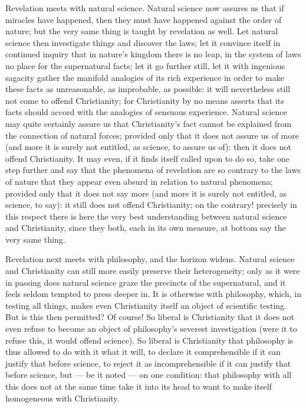 \documentclass[12pt,a4paper]{book}
\begin{document}
Revelation meets with natural science. Natural science now assures us that if
miracles have happened, then they must have happened against the order of
nature; but the very same thing is taught by revelation as well. Let natural
science then investigate things and discover the laws; let it convince itself
in continued inquiry that in
nature's kingdom there is no leap, in the system of laws no place for the
supernatural facts; let it go further still, let it with ingenious sagacity
gather the manifold analogies of its rich experience in order to make these
facts as unreasonable, as improbable, as possible: it will nevertheless still
not come to offend Christianity; for Christianity by no means asserts that its
facts should accord with the analogies of sensuous experience. Natural science
may quite certainly assure us that Christianity's fact cannot be explained from
the connection of natural forces; provided only that it does not assure us of
more (and more it is surely not entitled, as science, to assure us of): then it
does not offend Christianity. It may even, if it finds itself called upon to do
so, take one step further and say that the phenomena of revelation are so
contrary to the laws of nature that they appear even absurd in relation to
natural phenomena; provided only that it does not say more (and more it is
surely not entitled, as science, to say): it still does not offend
Christianity; on the contrary! precisely in this respect there is here the very
best understanding between natural science and Christianity, since they both,
each in its own measure, at bottom say the very same thing.

Revelation next meets with philosophy, and the horizon widens. Natural science
and Christianity can still more easily preserve their heterogeneity; only as it
were in passing does natural science graze the precincts of the supernatural,
and it feels seldom tempted to press deeper in. It is otherwise with
philosophy, which, in testing all things, makes even Christianity itself an
object of scientific testing. But is this then permitted? Of course! So liberal
is Christianity that it does not even refuse to become an object of
philosophy's severest investigation (were it to refuse this, it would offend
science). So liberal is Christianity that philosophy
is thus allowed to do with it what it will, to declare it comprehensible if it
can justify that before science, to reject it as incomprehensible if it can
justify that before science, but --- be it noted --- on one condition: that
philosophy with all this does not at the same time take it into its head to
want to make itself homogeneous with Christianity.
\end{document}

